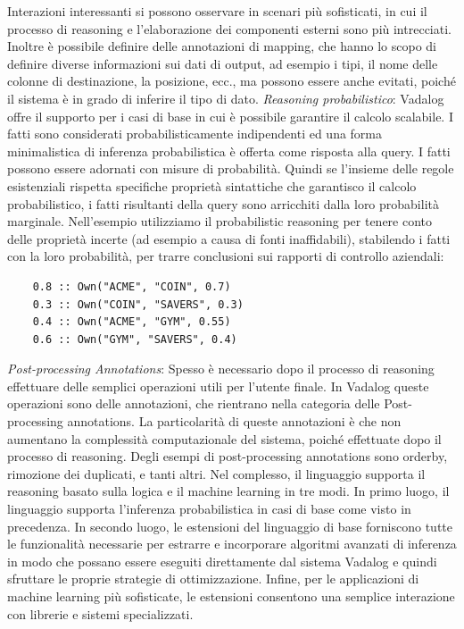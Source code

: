 Interazioni interessanti si possono osservare in scenari più sofisticati, in cui il processo di reasoning e l'elaborazione dei componenti esterni sono più intrecciati. \newline
Inoltre è possibile definire delle annotazioni di mapping, che hanno lo scopo di definire diverse informazioni sui dati di output, ad esempio i tipi, il nome delle colonne di destinazione, la posizione, ecc., ma possono essere anche evitati, poiché il sistema è in grado di inferire il tipo di dato. \newline \newline
\emph{Reasoning probabilistico}: Vadalog offre il supporto per i casi di base in cui è possibile garantire il calcolo scalabile. I fatti sono considerati probabilisticamente indipendenti ed una forma minimalistica di inferenza probabilistica è offerta come risposta alla query. I fatti possono essere adornati con misure di probabilità. \newline
Quindi se l'insieme delle regole esistenziali rispetta specifiche proprietà sintattiche che garantisco il calcolo probabilistico, i fatti risultanti della query sono arricchiti dalla loro probabilità marginale. \newline
Nell'esempio utilizziamo il probabilistic reasoning per tenere conto delle proprietà incerte (ad esempio a causa di fonti inaffidabili), stabilendo i fatti con la loro probabilità, per trarre conclusioni sui rapporti di controllo aziendali:
\begin{lstlisting}
	0.8 :: Own("ACME", "COIN", 0.7) 
	0.3 :: Own("COIN", "SAVERS", 0.3) 
	0.4 :: Own("ACME", "GYM", 0.55) 
	0.6 :: Own("GYM", "SAVERS", 0.4)
\end{lstlisting}
\emph{Post-processing Annotations}: Spesso è necessario dopo il processo di reasoning effettuare delle semplici operazioni utili per l'utente finale. \newline
In Vadalog queste operazioni sono delle annotazioni, che rientrano nella categoria delle Post-processing annotations. La particolarità di queste annotazioni è che non aumentano la complessità computazionale del sistema, poiché effettuate dopo il processo di reasoning. Degli esempi di post-processing annotations sono orderby, rimozione dei duplicati, e tanti altri. \newline \newline
Nel complesso, il linguaggio supporta il reasoning basato sulla logica e il machine learning in tre modi. In primo luogo, il linguaggio supporta l'inferenza probabilistica in casi di base come visto in precedenza. \newline
In secondo luogo, le estensioni del linguaggio di base forniscono tutte le funzionalità necessarie per estrarre e incorporare algoritmi avanzati di inferenza in modo che possano essere eseguiti direttamente dal sistema Vadalog e quindi sfruttare le proprie strategie di ottimizzazione. \newline
Infine, per le applicazioni di machine learning più sofisticate, le estensioni consentono una semplice interazione con librerie e sistemi specializzati.

